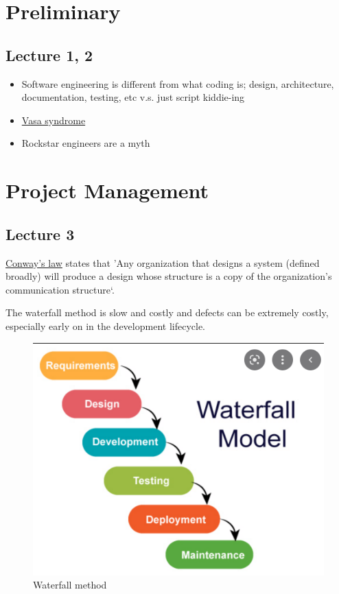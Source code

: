 \documentclass[10pt]{article}
\begin{document}
\section{Preliminary}
\subsection{Lecture 1, 2}
\begin{itemize}
	\item Software engineering is different from what coding is; design, architecture, documentation, testing, etc v.s. just script kiddie-ing
	\item \href{https://en.wikipedia.org/wiki/Vasa_syndrome}{Vasa syndrome}
	\item Rockstar engineers are a myth
\end{itemize}

\section{Project Management}
\subsection{Lecture 3}

\begin{definition}
	\href{https://en.wikipedia.org/wiki/Conway%27s_law}{Conway's law} states that 'Any organization that designs a system (defined broadly) will produce a design whose structure is a copy of the organization's communication structure`.
\end{definition}


The waterfall method is slow and costly and defects can be extremely costly, especially early on in the development lifecycle.

\begin{figure}[H]
	\centering
	\includegraphics[width=0.8\linewidth]{img/image_2022-09-14-14-35-07.png}
	\caption{Waterfall method}
\end{figure}
\end{document}
